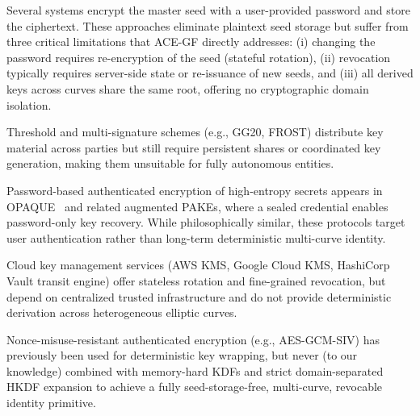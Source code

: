 \documentclass[12pt,a4paper]{article}
\begin{document}
  Several systems encrypt the master seed with a user-provided password and store the ciphertext. These approaches eliminate plaintext seed storage but suffer from three critical limitations that ACE-GF directly addresses:
  (i) changing the password requires re-encryption of the seed (stateful rotation),
  (ii) revocation typically requires server-side state or re-issuance of new seeds, and
  (iii) all derived keys across curves share the same root, offering no cryptographic domain isolation.

  Threshold and multi-signature schemes (e.g., GG20, FROST) distribute key material across parties but still require persistent shares or coordinated key generation, making them unsuitable for fully autonomous entities.

  Password-based authenticated encryption of high-entropy secrets appears in OPAQUE~\cite{opaque} and related augmented PAKEs, where a sealed credential enables password-only key recovery. While philosophically similar, these protocols target user authentication rather than long-term deterministic multi-curve identity.

  Cloud key management services (AWS KMS, Google Cloud KMS, HashiCorp Vault transit engine) offer stateless rotation and fine-grained revocation, but depend on centralized trusted infrastructure and do not provide deterministic derivation across heterogeneous elliptic curves.

  Nonce-misuse-resistant authenticated encryption (e.g., AES-GCM-SIV) has previously been used for deterministic key wrapping, but never (to our knowledge) combined with memory-hard KDFs and strict domain-separated HKDF expansion to achieve a fully seed-storage-free, multi-curve, revocable identity primitive.
\end{document}
